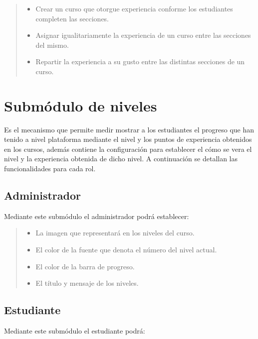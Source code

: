     \begin{quote}
    \begin{itemize}
        \item Crear un curso que otorgue experiencia conforme los estudiantes completen las secciones.
        \item Asignar igualitariamente la experiencia de un curso entre las secciones del mismo.
        \item Repartir la experiencia a su gusto entre las distintas secciones de un curso.
    \end{itemize}
    \end{quote}


\section{Submódulo de niveles}

Es el mecanismo que permite medir mostrar a los estudiantes el progreso que han tenido a nivel plataforma mediante el nivel y los puntos de experiencia obtenidos en los cursos, además contiene la configuración para establecer el cómo se vera el nivel y la experiencia obtenida de dicho nivel. A continuación se detallan las funcionalidades para cada rol. %

\subsection*{Administrador}
\noindent Mediante este submódulo el administrador podrá establecer:

    \begin{quote}
    \begin{itemize}
        \item La imagen que representará en los niveles del curso.
        \item El color de la fuente que denota el número del nivel actual.
        \item El color de la barra de progreso.
        \item El título y mensaje de los niveles.
    \end{itemize}
    \end{quote}

\subsection*{Estudiante}
\noindent Mediante este submódulo el estudiante podrá:

